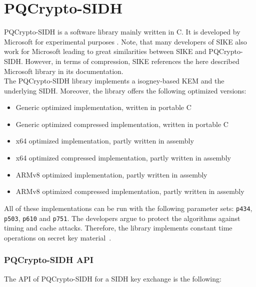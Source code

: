 \section{PQCrypto-SIDH}
PQCrypto-SIDH is a software library mainly written in C. It is developed by Microsoft for experimental purposes \parencite{microsoft2020sidh}. Note, that many developers of SIKE also work for Microsoft leading to great similarities between SIKE and PQCrypto-SIDH. However, in terms of compression, SIKE references  the here described Microsoft library in its documentation.\\
The PQCrypto-SIDH library implements a isogney-based KEM and the underlying SIDH. Moreover, the library offers the following optimized versions:
\begin{itemize}
  \item Generic optimized implementation, written in portable C
  \item Generic optimized compressed implementation, written in portable C
  \item x64 optimized implementation, partly written in assembly
  \item x64 optimized compressed implementation, partly written in assembly
  \item ARMv8 optimized implementation, partly written in assembly
  \item ARMv8 optimized compressed implementation, partly written in assembly
\end{itemize}
All of these implementations can be run with the following parameter sets: \texttt{p434}, \texttt{p503}, \texttt{p610} and \texttt{p751}. The developers argue to protect the algorithms against timing and cache attacks. Therefore, the library implements constant time operations on secret key material~\parencite{microsoft2020sidh}.

\subsubsection{PQCrypto-SIDH API}
The API of PQCrypto-SIDH for a SIDH key exchange is the following:

